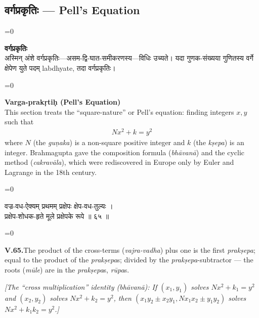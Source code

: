 \documentclass[11pt,a4paper]{article}
\newcommand{\dev}[1]{{\devanagarifont\color{sktcolor}#1}}
\newcommand{\iast}[1]{\textit{#1}}
\newenvironment{paracol}[1]{\begingroup}{\endgroup}
\newcommand{\switchcolumn}[1][]{%
  \ifnum#1=0\relax\else\par\nobreak\vspace{0.5em}\par\nobreak\fi%
}
\begin{document}
\newpage

\subsection*{\dev{वर्गप्रकृतिः — Pell's Equation}}

\begin{paracol}{2}
\switchcolumn[0]
\dev{%
\textbf{वर्गप्रकृतिः}\\[0.2cm]
अस्मिन् अंशे वर्गप्रकृतिः—असम-द्वि-घात-समीकरणस्य—विधिः
उच्यते। यदा गुणक-संख्यया गुणितस्य वर्गे क्षेपेण युते पदम्
labdhyate, तदा वर्गप्रकृतिः।
}

\switchcolumn[1]
\textbf{Varga-prakṛtiḥ (Pell's Equation)}\\[0.2cm]
This section treats the ``square-nature'' or Pell's equation:
finding integers $x, y$ such that
\begin{align*}
Nx^2 + k = y^2
\end{align*}
where $N$ (the \iast{guṇaka}) is a non-square positive integer and
$k$ (the \iast{kṣepa}) is an integer. Brahmagupta gave the
composition formula (\iast{bhāvanā}) and the cyclic method
(\iast{cakravāla}), which were rediscovered in Europe only by
Euler and Lagrange in the 18th century.
\end{paracol}

\vspace{0.5cm}

\begin{paracol}{2}
\switchcolumn[0]
\dev{%
वज्र-वध-ऐक्यम् प्रथमम् प्रक्षेपः क्षेप-वध-तुल्यः ।\\
प्रक्षेप-शोधक-हृते मूले प्रक्षेपके रूपे ॥ ६५ ॥
}

\switchcolumn[1]
\textbf{V.65.}\quad The product of the cross-terms (\iast{vajra-vadha})
plus one is the first \iast{prakṣepa}; equal to the product of the
\iast{prakṣepa}s; divided by the \iast{prakṣepa}-subtractor — the
roots (\iast{mūle}) are in the \iast{prakṣepa}s, \iast{rūpa}s.

\medskip
\textit{[The ``cross multiplication'' identity (bhāvanā): If
$(x_1, y_1)$ solves $Nx^2 + k_1 = y^2$ and $(x_2, y_2)$ solves
$Nx^2 + k_2 = y^2$, then $(x_1y_2 \pm x_2y_1, Nx_1x_2 \pm y_1y_2)$
solves $Nx^2 + k_1k_2 = y^2$.]}
\end{paracol}
\end{document}
